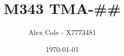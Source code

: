 \documentclass[a4paper]{article}
\title{M343 TMA-##}
\author{Alex Cole - X7773481}
\date{\today}
\begin{document}
\maketitle


\section{} %

\subsection{} %

\subsubsection{}



\subsubsection{}



\subsubsection{}

\subsection{}%





\section{}%

\subsection{}%


\subsection{}%

\subsubsection{}

\subsubsection{}
\end{document}
